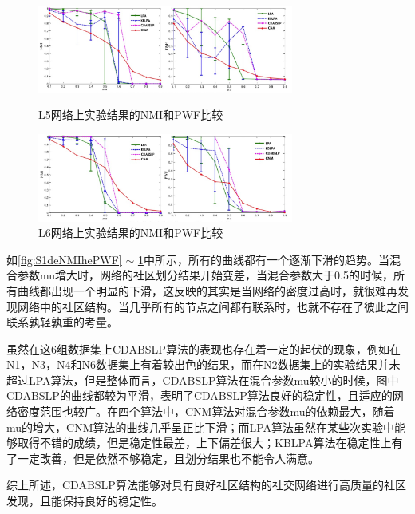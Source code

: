 \begin{figure}
  \centering
  \includegraphics[width=0.75\textwidth]{figures/S5deNMIhePWF}
  \caption{L5网络上实验结果的NMI和PWF比较}\label{fig:S5deNMIhePWF}

  \includegraphics[width=0.75\textwidth]{figures/S6deNMIhePWF}
  \caption{L6网络上实验结果的NMI和PWF比较}\label{fig:S6deNMIhePWF}
\end{figure}

如\ref{fig:S1deNMIhePWF} $\sim$ \ref{fig:S6deNMIhePWF}中所示，所有的曲线都有一个逐渐下滑的趋势。当混合参数mu增大时，网络的社区划分结果开始变差，当混合参数大于0.5的时候，所有曲线都出现一个明显的下滑，这反映的其实是当网络的密度过高时，就很难再发现网络中的社区结构。当几乎所有的节点之间都有联系时，也就不存在了彼此之间联系孰轻孰重的考量。

虽然在这6组数据集上CDABSLP算法的表现也存在着一定的起伏的现象，例如在N1，N3，N4和N6数据集上有着较出色的结果，而在N2数据集上的实验结果并未超过LPA算法，但是整体而言，CDABSLP算法在混合参数mu较小的时候，图中CDABSLP的曲线都较为平滑，表明了CDABSLP算法良好的稳定性，且适应的网络密度范围也较广。在四个算法中，CNM算法对混合参数mu的依赖最大，随着mu的增大，CNM算法的曲线几乎呈正比下滑；而LPA算法虽然在某些次实验中能够取得不错的成绩，但是稳定性最差，上下偏差很大；KBLPA算法在稳定性上有了一定改善，但是依然不够稳定，且划分结果也不能令人满意。

综上所述，CDABSLP算法能够对具有良好社区结构的社交网络进行高质量的社区发现，且能保持良好的稳定性。



